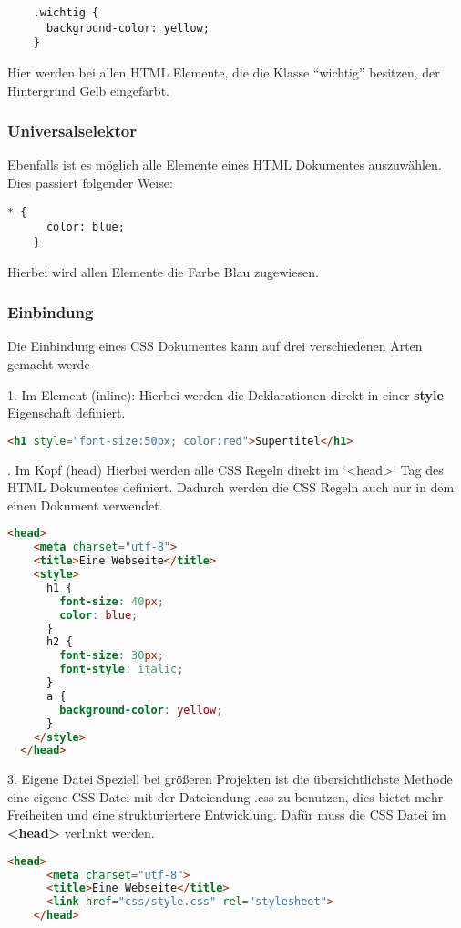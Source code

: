 \begin{lstlisting}
    .wichtig {
      background-color: yellow;
    }
\end{lstlisting}

Hier werden bei allen HTML Elemente, die die Klasse “wichtig” besitzen, der Hintergrund Gelb eingefärbt.

\subsubsection{Universalselektor}
Ebenfalls ist es möglich alle Elemente eines HTML Dokumentes auszuwählen. Dies passiert folgender Weise:

\begin{lstlisting}[caption=Universalselektor]
    * {
      color: blue;
    }
\end{lstlisting}

Hierbei wird allen Elemente die Farbe Blau zugewiesen.

\subsubsection{Einbindung}
Die Einbindung eines CSS Dokumentes kann auf drei verschiedenen Arten gemacht werde

1. Im Element (inline):
\newline
Hierbei werden die Deklarationen direkt in einer \textbf{style} Eigenschaft definiert.

\begin{lstlisting}[language=html]
    <h1 style="font-size:50px; color:red">Supertitel</h1>
\end{lstlisting}
. Im Kopf (head)
\newline
Hierbei werden alle CSS Regeln direkt im `<head>` Tag des HTML Dokumentes definiert. Dadurch werden die CSS Regeln auch nur in dem einen Dokument verwendet.

\begin{lstlisting}[language=html, caption=CSS Head Einbindung]
    <head>
    <meta charset="utf-8">
    <title>Eine Webseite</title>
    <style>
      h1 {
        font-size: 40px;
        color: blue;
      }
      h2 {
        font-size: 30px;
        font-style: italic;
      }
      a {
        background-color: yellow;
      }
    </style>
  </head>
\end{lstlisting}

3. Eigene Datei
\newline
Speziell bei größeren Projekten ist die übersichtlichste Methode eine eigene CSS Datei mit der Dateiendung .css zu benutzen, dies bietet mehr Freiheiten und eine strukturiertere Entwicklung. Dafür muss die CSS Datei im \textbf{<head>} verlinkt werden.

\begin{lstlisting}[language=html, caption=CSS Datei Einbindung]
    <head>
      <meta charset="utf-8">
      <title>Eine Webseite</title>
      <link href="css/style.css" rel="stylesheet">
    </head>
\end{lstlisting}

\cite{frontend_web_css}


